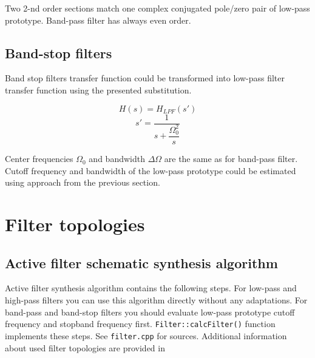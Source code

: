 Two 2-nd order sections match one complex conjugated pole/zero pair of low-pass
prototype. Band-pass filter has always even order. 




\section{Band-stop filters}

Band stop filters transfer function could be transformed into low-pass filter 
transfer function using the presented substitution. 

\begin{equation}
 H(s)=H_{LPF}(s')
\end{equation}
\begin{equation}
 s'=\dfrac{1}{s+\dfrac{\Omega_0^2}{s}}
\end{equation}

Center frequencies $\Omega_0$ and bandwidth $\Delta\Omega$ are the same as for 
band-pass filter. Cutoff frequency and bandwidth of the low-pass prototype 
could be estimated using approach from the previous section.

\chapter{Filter topologies}

\section{Active filter schematic synthesis algorithm}

Active filter synthesis algorithm contains the following steps. For low-pass
and high-pass filters you can use this algorithm directly without any
adaptations. For band-pass and band-stop filters you should evaluate low-pass
prototype cutoff frequency and stopband frequency first.
\verb|Filter::calcFilter()| function implements these steps. See
\verb|filter.cpp| for sources. Additional information about used filter 
topologies are provided in \cite{johnson,Tiet02,Horowitz}


